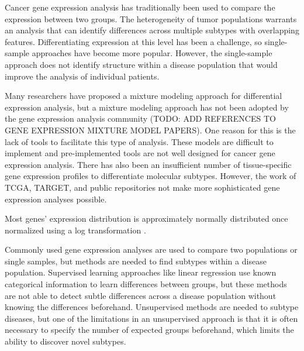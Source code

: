 \documentclass[fleqn,10pt]{wlscirep}
\begin{document}
Cancer gene expression analysis has traditionally been used to compare the expression between two groups. The heterogeneity of tumor populations warrants an analysis that can identify differences across multiple subtypes with overlapping features. Differentiating expression at this level has been a challenge, so single-sample approaches have become more popular. However, the single-sample approach does not identify structure within a disease population that would improve the analysis of individual patients. 


Many researchers have proposed a mixture modeling approach for differential expression analysis, but a mixture modeling approach has not been adopted by the gene expression analysis community (TODO: ADD REFERENCES TO GENE EXPRESSION MIXTURE MODEL PAPERS). One reason for this is the lack of tools to facilitate this type of analysis. These models are difficult to implement and pre-implemented tools are not well designed for cancer gene expression analysis. There has also been an insufficient number of tissue-specific gene expression profiles to differentiate molecular subtypes. However, the work of TCGA, TARGET, and public repositories not make more sophisticated gene expression analyses possible. 

Most genes' expression distribution is approximately normally distributed once normalized using a log transformation \cite{zwiener2014transforming}. 


Commonly used gene expression analyses are used to compare two populations or single samples, but methods are needed to find subtypes within a disease population. Supervised learning approaches like linear regression use known categorical information to learn differences between groups, but these methods are not able to detect subtle differences across a disease population without knowing the differences beforehand. Unsupervised methods are needed to subtype diseases, but one of the limitations in an unsupervised approach is that it is often necessary to specify the number of expected groups beforehand, which limits the ability to discover novel subtypes.
\end{document}
